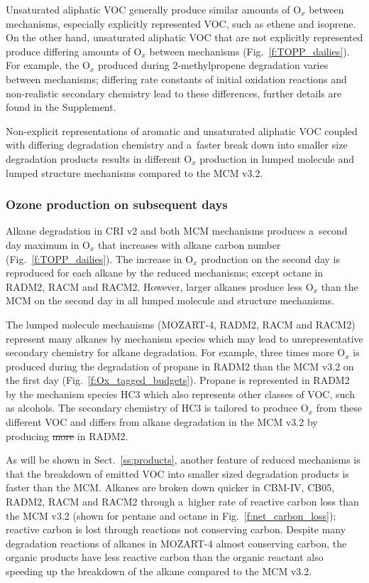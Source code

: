 \documentclass[acpd, online, hvmath]{copernicus}
\providecommand{\DIFadd}[1]{{\protect\color{blue}\uwave{#1}}} %
\providecommand{\DIFdel}[1]{{\protect\color{red}\sout{#1}}}                      %
\providecommand{\DIFaddbegin}{} %
\providecommand{\DIFaddend}{} %
\providecommand{\DIFdelbegin}{} %
\providecommand{\DIFdelend}{} %
\begin{document}
Unsaturated aliphatic VOC generally produce similar amounts of
O$_{x}$ between mechanisms, especially explicitly represented VOC,
such as ethene and isoprene.  On the other hand, unsaturated aliphatic
VOC that are not explicitly represented produce differing amounts of
O$_{x}$ between mechanisms (Fig.~\ref{f:TOPP_dailies}).  For
example, the O$_{x}$ produced during $2$-methylpropene degradation
varies between mechanisms; differing rate constants of initial
oxidation reactions and non-realistic secondary chemistry lead to
these differences, further details are found in the Supplement.

Non-explicit representations of aromatic and unsaturated aliphatic VOC
coupled with differing degradation chemistry and a~faster break down
into smaller size degradation products results in different O$_{x}$
production in lumped molecule and lumped structure mechanisms compared
to the MCM v3.2.

\subsubsection{Ozone production on subsequent days}
\label{sss:profiles}

Alkane degradation in CRI v2 and both MCM mechanisms produces a~second
day maximum in O$_{x}$ that increases with alkane carbon number
(Fig.~\ref{f:TOPP_dailies}).  The increase in O$_{x}$ production on
the second day is reproduced for each alkane by the reduced
mechanisms; except octane in RADM2, RACM and RACM2.  However, larger
alkanes produce less O$_{x}$ than the MCM on the second day in all
lumped molecule and structure mechanisms.

The lumped molecule mechanisms (MOZART-4, RADM2, RACM and RACM2)
represent many alkanes by mechanism species which may lead to
unrepresentative secondary chemistry for alkane degradation.  For
example, three times more O$_{x}$ is produced during the
degradation of propane in RADM2 than the MCM v3.2 on the first day
(Fig.~\ref{f:Ox_tagged_budgets}).  Propane is represented in RADM2 by
the mechanism species HC3 which also represents other classes of VOC,
such as alcohols.  The secondary chemistry of HC3 is tailored to
produce O$_{x}$ from these different VOC and differs from alkane
degradation in the MCM v3.2 by producing \DIFdelbegin \DIFdel{more }%
\DIFdelend \DIFaddbegin \DIFadd{less ketones }\DIFaddend in RADM2.

As will be shown in Sect.~\ref{ss:products}, another feature of
reduced mechanisms is that the breakdown of emitted VOC into smaller
sized degradation products is faster than the MCM.  Alkanes are broken
down quicker in CBM-IV, CB05, RADM2, RACM and RACM2 through a~higher
rate of reactive carbon loss than the MCM v3.2 (shown for pentane and
octane in Fig.~\ref{f:net_carbon_loss}); reactive carbon is lost
through reactions not conserving carbon.  Despite many degradation
reactions of alkanes in MOZART-4 almost conserving carbon, the organic
products have less reactive carbon than the organic reactant also
speeding up the breakdown of the alkane compared to the MCM v3.2.
\end{document}

